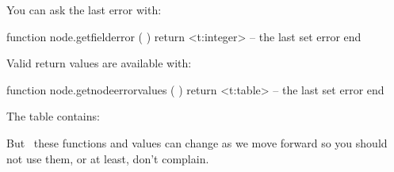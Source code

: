 You can ask the last error with:

\starttyping[option=LUA]
function node.getfielderror ( )
    return <t:integer> -- the last set error
end
\stoptyping

Valid return values are available with:

\starttyping[option=LUA]
function node.getnodeerrorvalues ( )
    return <t:table> -- the last set error
end
\stoptyping

The table contains:


But \unknown\ these functions and values can change as we move forward so you
should not use them, or at least, don't complain.

\stopsubsection

\stopsection

\stopdocument
